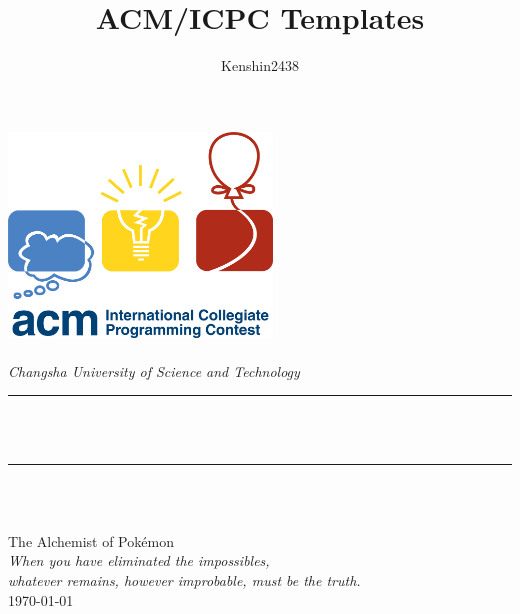 \documentclass[12pt, UTF8]{ctexbook}
\title{ACM/ICPC Templates}
\author{Kenshin2438}
\begin{document}
\begin{titlepage}
  \newcommand{\HRule}{\rule{\linewidth}{0.5mm}}
  \centering
  \includegraphics[width=7cm]{icpc.png}\\[1cm]
  \quad\\[1.5cm]
  \textsl{\Large Changsha University of Science and Technology }\\[0.5cm]
  \makeatletter
  \HRule \\[0.4cm]
  { \huge \bfseries \@title }\\[0.3cm]
  \HRule \\[1.5cm]
  \begin{minipage}{0.4\textwidth}
    \centering\large\@author
  \end{minipage}\\[3cm]
  \makeatother
  {\large The Alchemist of Pokémon}\\[2cm]
  {\large 
  \emph{When you have eliminated the impossibles, \\whatever remains, however improbable, must be the truth.}
  }\\[0.5cm]
  {\large \today}\\[2cm]
  \vfill
\end{titlepage}

\frontmatter
\tableofcontents

\mainmatter








\end{document}
